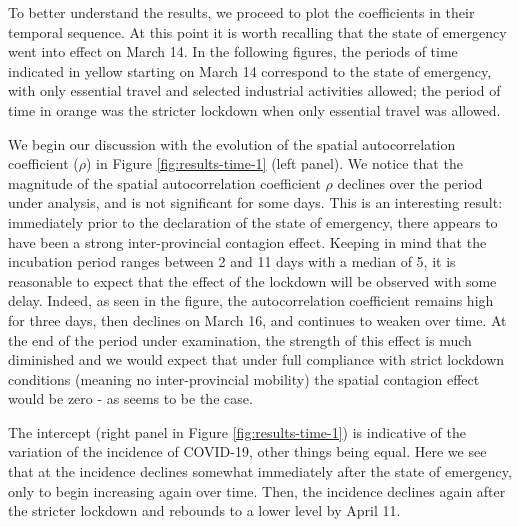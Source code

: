 \documentclass[]{elsarticle} %
\begin{document}
To better understand the results, we proceed to plot the coefficients in
their temporal sequence. At this point it is worth recalling that the
state of emergency went into effect on March 14. In the following
figures, the periods of time indicated in yellow starting on March 14
correspond to the state of emergency, with only essential travel and
selected industrial activities allowed; the period of time in orange was
the stricter lockdown when only essential travel was allowed.

We begin our discussion with the evolution of the spatial
autocorrelation coefficient (\(\rho\)) in Figure
\ref{fig:results-time-1} (left panel). We notice that the magnitude of
the spatial autocorrelation coefficient \(\rho\) declines over the
period under analysis, and is not significant for some days. This is an
interesting result: immediately prior to the declaration of the state of
emergency, there appears to have been a strong inter-provincial
contagion effect. Keeping in mind that the incubation period ranges
between 2 and 11 days with a median of 5, it is reasonable to expect
that the effect of the lockdown will be observed with some delay.
Indeed, as seen in the figure, the autocorrelation coefficient remains
high for three days, then declines on March 16, and continues to weaken
over time. At the end of the period under examination, the strength of
this effect is much diminished and we would expect that under full
compliance with strict lockdown conditions (meaning no inter-provincial
mobility) the spatial contagion effect would be zero - as seems to be
the case.

The intercept (right panel in Figure \ref{fig:results-time-1}) is
indicative of the variation of the incidence of COVID-19, other things
being equal. Here we see that at the incidence declines somewhat
immediately after the state of emergency, only to begin increasing again
over time. Then, the incidence declines again after the stricter
lockdown and rebounds to a lower level by April 11.
\end{document}
